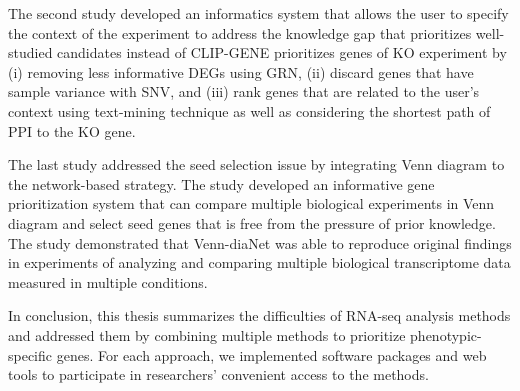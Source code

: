 \documentclass[oneside,phd]{snuthesis}
\begin{document}
The second study developed an informatics system that allows the user to specify the context of the experiment to address the knowledge gap that prioritizes well-studied candidates instead of CLIP-GENE prioritizes genes of KO experiment by (i) removing less informative DEGs using GRN, (ii) discard genes that have sample variance with SNV, and (iii) rank genes that are related to the user's context using text-mining technique as well as considering the shortest path of PPI to the KO gene.

The last study addressed the seed selection issue by integrating Venn diagram to the network-based strategy.
The study developed an informative gene prioritization system that can compare multiple biological experiments in Venn diagram and select seed genes that is free from the pressure of prior knowledge.
The study demonstrated that Venn-diaNet was able to reproduce original findings in experiments of analyzing and comparing multiple biological transcriptome data measured in multiple conditions. 

In conclusion, this thesis summarizes the difficulties of RNA-seq analysis methods and addressed them by combining multiple methods to prioritize phenotypic-specific genes. For each approach, we implemented software packages and web tools to participate in researchers’ convenient access to the methods.
\end{document}
